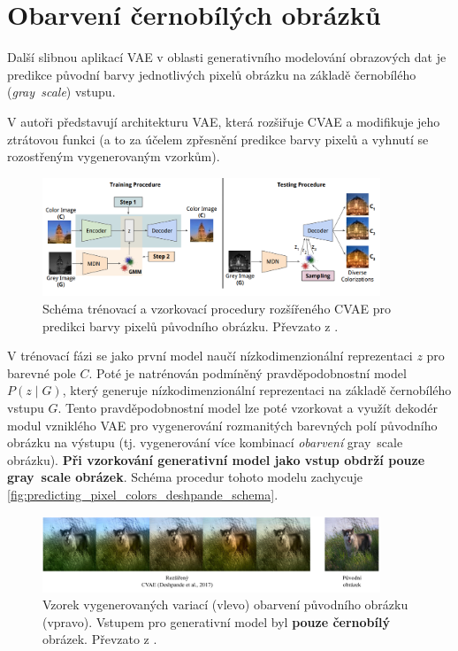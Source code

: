 \newpage
\section{Obarvení černobílých obrázků}
\label{sec:applications_image_coloring}
Další slibnou aplikací VAE v oblasti generativního modelování obrazových dat je predikce původní barvy jednotlivých pixelů obrázku na základě černobílého (\emph{gray~scale}) vstupu.

V \textcite{Deshpande2017} autoři představují architekturu VAE, která rozšiřuje CVAE a modifikuje jeho ztrátovou funkci (a to za účelem zpřesnění predikce barvy pixelů a vyhnutí se rozostřeným vygenerovaným vzorkům).
\begin{figure}[H]
    \centering
    \includegraphics[width=0.9\textwidth]{figures/applications/predicting_pixel_colors_deshpande_vae_schema.png}
    \caption{Schéma trénovací a vzorkovací procedury rozšířeného CVAE pro predikci barvy pixelů původního obrázku. Převzato z \textcite{Deshpande2017}.}
    \label{fig:predicting_pixel_colors_deshpande_schema}
\end{figure}

V trénovací fázi se jako první model naučí nízkodimenzionální reprezentaci $z$ pro barevné pole $C$.
Poté je natrénován podmíněný pravděpodobnostní model $P(z \mid G)$, který generuje nízkodimenzionální reprezentaci na základě černobílého vstupu $G$. 
Tento pravděpodobnostní model lze poté vzorkovat a využít dekodér modul vzniklého VAE pro vygenerování rozmanitých barevných polí původního obrázku na výstupu (tj. vygenerování více kombinací \emph{obarvení} gray~scale obrázku).
\textbf{Při vzorkování generativní model jako vstup obdrží pouze gray~scale obrázek}. Schéma procedur tohoto modelu zachycuje \autoref{fig:predicting_pixel_colors_deshpande_schema}. \cite{Deshpande2017}

\begin{figure}[H]
    \centering
    \includegraphics[width=0.9\textwidth]{figures/applications/predicting_pixel_colors_deshpande.pdf}
    \caption{Vzorek vygenerovaných variací (vlevo) obarvení původního obrázku (vpravo). Vstupem pro generativní model byl \textbf{pouze černobílý} obrázek. Převzato z \textcite{Deshpande2017}.}
    \label{fig:predicting_pixel_colors_deshpande}
\end{figure}

